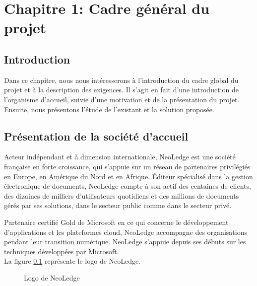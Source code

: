 
\chapter*{Chapitre 1: Cadre général du projet}
\label{chap:cadreGeneral}
\setcounter{part}{0}
\setcounter{chapter}{0}
\setcounter{section}{0}
\renewcommand{\thechapter}{\arabic{chapter}}
\renewcommand{\thepart}{\arabic{part}}
\renewcommand{\thesection}{\arabic{section}}

\section*{Introduction}
Dans ce chapitre, nous nous intéresserons à l'introduction du cadre global du projet et à la description des exigences. Il s'agit en fait d'une introduction de l'organisme d'accueil, suivie d'une motivation et de la présentation du projet. Ensuite, nous présentons l'étude de l'existant et la solution proposée. 

\section{Présentation de la société d'accueil}
Acteur indépendant et à dimension internationale, NeoLedge est une société française en forte croissance, qui s'appuie sur un réseau de partenaires privilégiés en Europe, en Amérique du Nord et en Afrique.
\medskip
Éditeur spécialisé dans la gestion électronique de documents, NeoLedge compte à son actif des centaines de clients, des dizaines de milliers d'utilisateurs quotidiens et des millions de documents gérés par ses solutions, dans le secteur public comme dans le secteur privé.

\medskip

Partenaire certifié Gold de Microsoft en ce qui concerne le développement d'applications et les plateformes cloud, NeoLedge accompagne des organisations 
pendant leur transition numérique.
NeoLedge s'appuie depuis ses débuts sur les techniques développées par Microsoft. \\

La figure \ref{fig:logoNeoledge} représente le logo de NeoLedge.\\
\begin{figure}[!h]
\centering
{}
\caption{Logo de NeoLedge}
\label{fig:logoNeoledge}
\end{figure}

